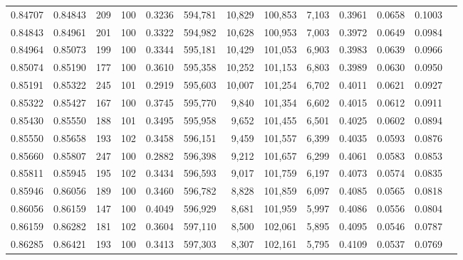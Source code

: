 \begin{tabular}{rrrrrrrrrrrrr}
0.84707 & 0.84843 &   209 & 100 &                                     0.3236 & 594,781 &  10,829 & 100,853 &   7,103 & 0.3961 & 0.0658 & 0.1003 \\
0.84843 & 0.84961 &   201 & 100 &                                     0.3322 & 594,982 &  10,628 & 100,953 &   7,003 & 0.3972 & 0.0649 & 0.0984 \\
0.84964 & 0.85073 &   199 & 100 &                                     0.3344 & 595,181 &  10,429 & 101,053 &   6,903 & 0.3983 & 0.0639 & 0.0966 \\
0.85074 & 0.85190 &   177 & 100 &                                     0.3610 & 595,358 &  10,252 & 101,153 &   6,803 & 0.3989 & 0.0630 & 0.0950 \\
0.85191 & 0.85322 &   245 & 101 &                                     0.2919 & 595,603 &  10,007 & 101,254 &   6,702 & 0.4011 & 0.0621 & 0.0927 \\
0.85322 & 0.85427 &   167 & 100 &                                     0.3745 & 595,770 &   9,840 & 101,354 &   6,602 & 0.4015 & 0.0612 & 0.0911 \\
0.85430 & 0.85550 &   188 & 101 &                                     0.3495 & 595,958 &   9,652 & 101,455 &   6,501 & 0.4025 & 0.0602 & 0.0894 \\
0.85550 & 0.85658 &   193 & 102 &                                     0.3458 & 596,151 &   9,459 & 101,557 &   6,399 & 0.4035 & 0.0593 & 0.0876 \\
0.85660 & 0.85807 &   247 & 100 &                                     0.2882 & 596,398 &   9,212 & 101,657 &   6,299 & 0.4061 & 0.0583 & 0.0853 \\
0.85811 & 0.85945 &   195 & 102 &                                     0.3434 & 596,593 &   9,017 & 101,759 &   6,197 & 0.4073 & 0.0574 & 0.0835 \\
0.85946 & 0.86056 &   189 & 100 &                                     0.3460 & 596,782 &   8,828 & 101,859 &   6,097 & 0.4085 & 0.0565 & 0.0818 \\
0.86056 & 0.86159 &   147 & 100 &                                     0.4049 & 596,929 &   8,681 & 101,959 &   5,997 & 0.4086 & 0.0556 & 0.0804 \\
0.86159 & 0.86282 &   181 & 102 &                                     0.3604 & 597,110 &   8,500 & 102,061 &   5,895 & 0.4095 & 0.0546 & 0.0787 \\
0.86285 & 0.86421 &   193 & 100 &                                     0.3413 & 597,303 &   8,307 & 102,161 &   5,795 & 0.4109 & 0.0537 & 0.0769 \\

\end{tabular}

